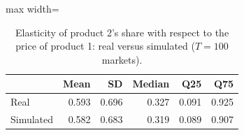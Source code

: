 \begin{table}[H]
\centering\small
\caption{Elasticity of product 2's share with respect to the price of product 1: real versus simulated ($T=100$ markets).}\label{tab:q8d_cell_21}
\begin{adjustbox}{max width=\linewidth}
\begin{tabular}{lrrrrr}
\toprule
 & Mean & SD & Median & Q25 & Q75 \\
\midrule
Real & 0.593 & 0.696 & 0.327 & 0.091 & 0.925 \\
Simulated & 0.582 & 0.683 & 0.319 & 0.089 & 0.907 \\
\bottomrule
\end{tabular}
\end{adjustbox}
\par\vspace{3pt}{\footnotesize Element $(2,1)$ of the elasticity matrix $\partial s_j/\partial p_k\cdot p_k/s_j$ across the 100 markets; simulated uses the Q8c estimates, real uses the true parameters.}
\end{table}
